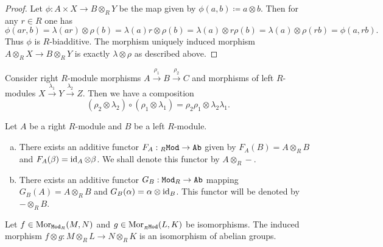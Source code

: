 \begin{proof}
    Let \(\phi: A \times X \to B \otimes_R Y\) be the map given by
    \(\phi(a, b) \coloneq a \otimes b\). Then for any \(r \in R\) one has
    \[
        \phi(a r, b)
        = \lambda(a r) \otimes \rho(b)
        = \lambda(a) r \otimes \rho(b)
        = \lambda(a) \otimes r \rho(b)
        = \lambda(a) \otimes \rho(r b)
        = \phi(a, r b).
    \]
    Thus \(\phi\) is \(R\)-biadditive. The morphism uniquely induced morphism
    \(A \otimes_R X \to B \otimes_R Y\) is exactly \(\lambda \otimes \rho\) as
    described above.
\end{proof}

\begin{corollary}
    \label{cor:composition-tensored-maps}
    Consider right \(R\)-module morphisms \(A \xrightarrow{\rho_1} B
    \xrightarrow{\rho_2} C\) and morphisms of left \(R\)-modules \(X
    \xrightarrow{\lambda_1} Y \xrightarrow{\lambda_2} Z\). Then we have a composition
    \[
        (\rho_2 \otimes \lambda_2) \circ (\rho_1 \otimes \lambda_1)
        = \rho_2 \rho_1 \otimes \lambda_2 \lambda_1.
    \]
\end{corollary}

\begin{lemma}
    \label{lem:addive-tensor-functors}
    Let \(A\) be a right \(R\)-module and \(B\) be a left \(R\)-module.
    \begin{enumerate}[(a)]\setlength\itemsep{0em}
        \item There exists an additive functor \(F_A: {{}_{R}\texttt{Mod}} \to {\texttt{Ab}}\) given by
              \(F_A(B) = A \otimes_R B\) and \(F_A(\beta) = \operatorname{id}_A \otimes \beta\). We shall
              denote this functor by \(A \otimes_R -\).

        \item There exists an additive functor \(G_B: {\texttt{Mod}_{R}} \to {\texttt{Ab}}\) mapping \(G_B(A) =
              A \otimes_R B\) and \(G_B(\alpha) = \alpha \otimes \operatorname{id}_B\). This functor will
              be denoted by \(- \otimes_R B\).
    \end{enumerate}
\end{lemma}

\begin{corollary}
    \label{cor:isos-induce-iso-tensor}
    Let \(f \in \operatorname{Mor}_{{\texttt{Mod}_{R}}}(M, N)\) and \(g \in \operatorname{Mor}_{{{}_{R}\texttt{Mod}}}(L, K)\) be
    isomorphisms. The induced morphism
    \(f \otimes g: M \otimes_R L \to N \otimes_R K\) is an isomorphism of abelian
    groups.
\end{corollary}

